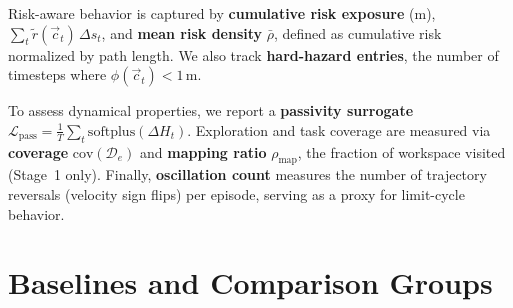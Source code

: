 Risk-aware behavior is captured by \textbf{cumulative risk exposure} (m), $\sum_t \tilde{r}(\vec{c}_t)\,\Delta s_t$, and \textbf{mean risk density} $\bar{\rho}$, defined as cumulative risk normalized by path length. We also track \textbf{hard-hazard entries}, the number of timesteps where $\phi(\vec{c}_t) < 1\,\text{m}$.

To assess dynamical properties, we report a \textbf{passivity surrogate} $\mathcal{L}_{\mathrm{pass}} = \frac{1}{T}\sum_t \mathrm{softplus}(\Delta H_t)$. Exploration and task coverage are measured via \textbf{coverage} $\mathrm{cov}(\mathcal{D}_e)$  and \textbf{mapping ratio} $\rho_{\mathrm{map}}$, the fraction of workspace visited (Stage~1 only). Finally, \textbf{oscillation count} measures the number of trajectory reversals (velocity sign flips) per episode, serving as a proxy for limit-cycle behavior.
\section{Baselines and Comparison Groups}
\label{sec:ch6:baselines}

